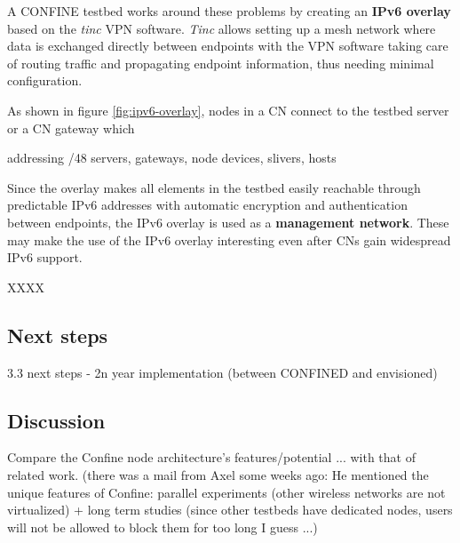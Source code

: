 \documentclass[conference]{IEEEtran}
\begin{document}
A CONFINE testbed works around these problems by creating an \textbf{IPv6
  overlay} based on the \emph{tinc} \cite{tinc} VPN software.  \emph{Tinc}
allows setting up a mesh network where data is exchanged directly between
endpoints with the VPN software taking care of routing traffic and propagating
endpoint information, thus needing minimal configuration.

As shown in
figure \ref{fig:ipv6-overlay}, nodes in a CN connect to the testbed server or a CN gateway which

addressing /48 servers, gateways, node devices, slivers, hosts

Since the overlay makes all elements in the testbed easily reachable through
predictable IPv6 addresses with automatic encryption and authentication
between endpoints, the IPv6 overlay is used as a \textbf{management network}.
These may make the use of the IPv6 overlay interesting even after CNs gain
widespread IPv6 support.


XXXX

\subsection{Next steps}
3.3 next steps
- 2n year implementation (between CONFINED and envisioned)

\subsection{Discussion}

Compare the Confine node architecture's features/potential ... with that of
related work.
(there was a mail from Axel some weeks ago: He mentioned the unique features of
Confine: parallel experiments (other wireless networks are not virtualized) +
long term studies (since other testbeds have dedicated nodes, users will not be
allowed to block them for too long I guess ...)



\end{document}
